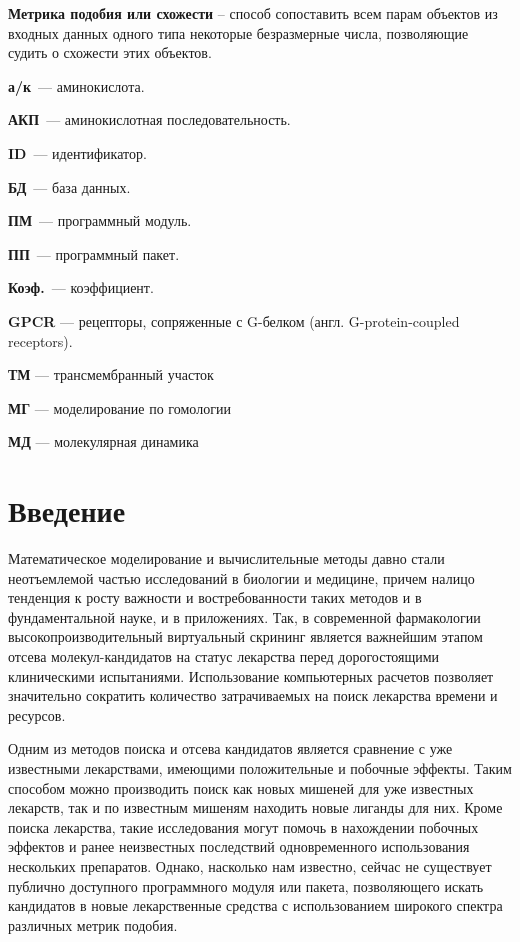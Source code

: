 \documentclass[a4paper,14pt]{article}         %
\begin{document}
\textbf{Метрика подобия или схожести} -- способ сопоставить всем парам объектов из входных данных одного типа некоторые безразмерные числа, позволяющие судить о схожести этих объектов.

\textbf{а/к}~--- аминокислота.

\textbf{АКП}~--- аминокислотная последовательность.

\textbf{ID}~--- идентификатор.

\textbf{БД}~--- база данных.

\textbf{ПМ}~--- программный модуль.

\textbf{ПП}~--- программный пакет.

\textbf{Коэф.}~--- коэффициент.


\textbf{GPCR} --- рецепторы, сопряженные с G-белком (англ. G-protein-coupled receptors).

\color{gray}
\textbf{ТМ} --- трансмембранный участок

\textbf{МГ} --- моделирование по гомологии

\textbf{МД} --- молекулярная динамика
\color{black}

\newpage
\section{Введение}
Математическое моделирование и вычислительные методы давно стали неотъемлемой частью исследований в биологии и медицине, причем налицо тенденция к росту важности и востребованности таких методов и в фундаментальной науке, и в приложениях. Так, в современной фармакологии высокопроизводительный виртуальный скрининг является важнейшим этапом отсева молекул-кандидатов на статус лекарства перед дорогостоящими клиническими испытаниями. Использование компьютерных расчетов позволяет значительно сократить количество затрачиваемых на поиск лекарства времени и ресурсов.

Одним из методов поиска и отсева кандидатов является сравнение с уже известными лекарствами, имеющими положительные и побочные эффекты. Таким способом можно производить поиск как новых мишеней для уже известных лекарств, так и по известным мишеням находить новые лиганды для них. Кроме поиска лекарства, такие исследования могут помочь в нахождении побочных эффектов и ранее неизвестных последствий одновременного использования нескольких препаратов. Однако, насколько нам известно, сейчас не существует публично доступного программного модуля или пакета, позволяющего искать кандидатов в новые лекарственные средства с использованием широкого спектра различных метрик подобия.
\end{document}
